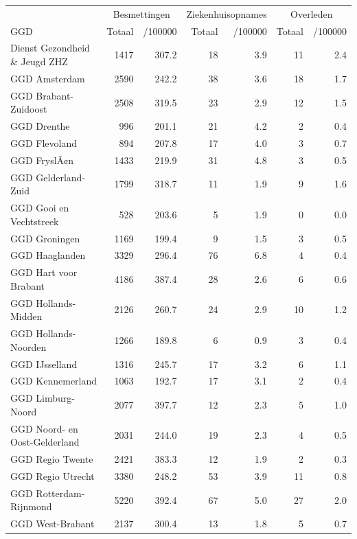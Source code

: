 \documentclass[
  english,
  man,floatsintext]{apa6}
\begin{document}
\begin{table}
\centering\begingroup\fontsize{10}{12}\selectfont

\begin{threeparttable}
\begin{tabular}{lrrrrrr}
\toprule
\multicolumn{1}{c}{ } & \multicolumn{2}{c}{Besmettingen} & \multicolumn{2}{c}{Ziekenhuisopnames} & \multicolumn{2}{c}{Overleden} \\
\cmidrule(l{3pt}r{3pt}){2-3} \cmidrule(l{3pt}r{3pt}){4-5} \cmidrule(l{3pt}r{3pt}){6-7}
GGD & Totaal & /100000 & Totaal & /100000 & Totaal & /100000\\
\midrule
Dienst Gezondheid \& Jeugd ZHZ & 1417 & 307.2 & 18 & 3.9 & 11 & 2.4\\
GGD Amsterdam & 2590 & 242.2 & 38 & 3.6 & 18 & 1.7\\
GGD Brabant-Zuidoost & 2508 & 319.5 & 23 & 2.9 & 12 & 1.5\\
GGD Drenthe & 996 & 201.1 & 21 & 4.2 & 2 & 0.4\\
GGD Flevoland & 894 & 207.8 & 17 & 4.0 & 3 & 0.7\\
GGD FryslÃ¢n & 1433 & 219.9 & 31 & 4.8 & 3 & 0.5\\
GGD Gelderland-Zuid & 1799 & 318.7 & 11 & 1.9 & 9 & 1.6\\
GGD Gooi en Vechtstreek & 528 & 203.6 & 5 & 1.9 & 0 & 0.0\\
GGD Groningen & 1169 & 199.4 & 9 & 1.5 & 3 & 0.5\\
GGD Haaglanden & 3329 & 296.4 & 76 & 6.8 & 4 & 0.4\\
GGD Hart voor Brabant & 4186 & 387.4 & 28 & 2.6 & 6 & 0.6\\
GGD Hollands-Midden & 2126 & 260.7 & 24 & 2.9 & 10 & 1.2\\
GGD Hollands-Noorden & 1266 & 189.8 & 6 & 0.9 & 3 & 0.4\\
GGD IJsselland & 1316 & 245.7 & 17 & 3.2 & 6 & 1.1\\
GGD Kennemerland & 1063 & 192.7 & 17 & 3.1 & 2 & 0.4\\
GGD Limburg-Noord & 2077 & 397.7 & 12 & 2.3 & 5 & 1.0\\
GGD Noord- en Oost-Gelderland & 2031 & 244.0 & 19 & 2.3 & 4 & 0.5\\
GGD Regio Twente & 2421 & 383.3 & 12 & 1.9 & 2 & 0.3\\
GGD Regio Utrecht & 3380 & 248.2 & 53 & 3.9 & 11 & 0.8\\
GGD Rotterdam-Rijnmond & 5220 & 392.4 & 67 & 5.0 & 27 & 2.0\\
GGD West-Brabant & 2137 & 300.4 & 13 & 1.8 & 5 & 0.7\\

\end{tabular}
\end{threeparttable}
\end{table}
\end{document}
